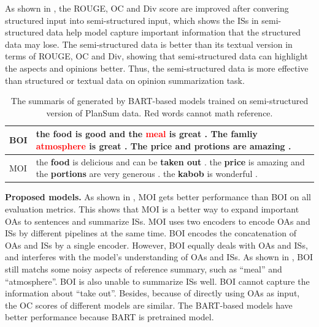 As shown in , the ROUGE, OC and Div score are improved after convering structured input into semi-structured input, which shows the ISs in semi-structured data help model capture important information that the structured data may lose.
The semi-structured data 
is better than its textual version in terms of ROUGE, OC and Div,
showing that semi-structured data
can highlight the aspects and opinions better.
Thus,
the semi-structured data is more effective than structured or textual data on opinion summarization task.

\begin{table}[th]
	\begin{center}
		\small
		\begin{tabular}{|m{0.5cm}|m{7.2cm}|}	
			\hline
			BOI & the \textbf{food} is good and the \textcolor{red}{meal} is great .
			The famliy \textcolor{red}{atmosphere} is great . The \textbf{price} and \textbf{protions} are amazing . \\
			\hline
			MOI &the \textbf{food} is delicious and can be \textbf{taken out} . the \textbf{price} is amazing and the \textbf{portions} are very generous . the \textbf{kabob} is wonderful . \\
			
			\hline
		\end{tabular}
	\end{center}
	\caption{The summaris of  generated by BART-based models trained on semi-structured version of PlanSum data.
		Red words cannot math reference.
	}\label{tab:exp}  
\end{table}

\textbf{Proposed models.}
As shown in , MOI gets better performance than BOI on all evaluation metrics. 
This shows that
MOI is a better way to expand important OAs to sentences and summarize ISs. 
MOI uses two encoders to encode OAs and ISs by different pipelines
at the same time. BOI encodes the concatenation of OAs and ISs by a single encoder. 
However, BOI equally deals with OAs and ISs,
and interferes with the model's understanding of OAs and ISs. 
As shown in ,
BOI still matchs some noisy aspects of reference summary, such as ``meal'' and ``atmosphere''.
BOI is also unable to summarize ISs well.
BOI cannot capture the information about ``take out''.
Besides, because of directly using OAs as input, the OC scores of different models are similar. The BART-based models have better performance because BART is pretrained model.


